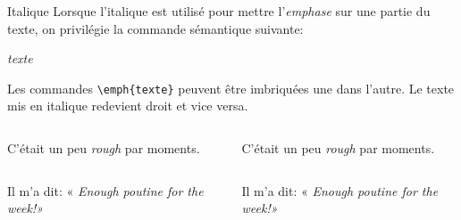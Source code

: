 \begin{frame}[fragile,c]{Italique}
	 Lorsque l'italique est utilisé pour mettre l'\emph{emphase} sur une partie du texte, on privilégie
	 la commande sémantique suivante:
	 
\begin{codesource}
	\emph{texte}
\end{codesource}

	Les commandes \lstinline|\emph{texte}| peuvent être imbriquées une dans l'autre. Le texte mis en italique redevient droit et vice versa.
	
	\begin{columns}
		\begin{column}{.49\textwidth}
			\vspace{-5.5mm}
\begin{codesource}
	C'était un peu \emph{rough}	par 
	moments.
\end{codesource}
		\end{column}
		\begin{column}{.49\textwidth}
			C'était un peu \emph{rough} par moments.
		\end{column}
	\end{columns}

	\begin{columns}
		\begin{column}{.49\textwidth}
			\vspace{-5.5mm}
\begin{codesource}
	Il m'a dit: « \emph{Enough 
	\emph{poutine} for the week!»}
\end{codesource}
		\end{column}
		\begin{column}{.49\textwidth}
			Il m'a dit: « \emph{Enough \textup{poutine} for the week!»}
		\end{column}
	\end{columns}
	
\end{frame}

